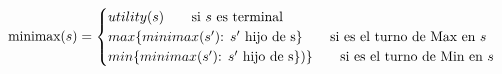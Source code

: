 \documentclass[preview]{standalone}
\begin{document}
\begin{align*}
\text{minimax($s$)} =  \begin{cases}
                                 utility(s) \qquad \text{si $s$ es terminal} \cr
                                 max\{minimax(\text{$s'$): $s'$ hijo de }$s$\}\qquad \text{si es el turno de Max en $s$} \cr
                                 min\{minimax(\text{$s'$): $s'$ hijo de }$s$\})\}\qquad \text{si es el turno de Min en $s$} \cr
                                 \end{cases}
\end{align*}
\end{document}
